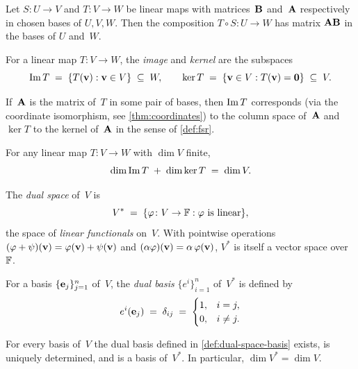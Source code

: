 \begin{theorem}
\label{thm:composition-of-maps}
Let $S \colon U \to V$ and $T \colon V \to W$ be linear maps with
matrices~$\mathbf{B}$ and~$\mathbf{A}$ respectively in chosen bases of
$U, V, W$. Then the composition $T \circ S \colon U \to W$ has matrix
$\mathbf{A}\mathbf{B}$ in the bases of $U$ and~$W$.
\end{theorem}

\begin{definition}
\label{def:image-kernel}
For a linear map $T \colon V \to W$, the \emph{image} and
\emph{kernel} are the subspaces
\[
  \operatorname{Im} T \;=\; \{T(\mathbf{v}) : \mathbf{v} \in V\} \;\subseteq\; W,
  \qquad
  \ker T \;=\; \{\mathbf{v} \in V : T(\mathbf{v}) = \mathbf{0}\} \;\subseteq\; V.
\]
\end{definition}

If~$\mathbf{A}$ is the matrix of~$T$ in some pair of bases, then
$\operatorname{Im} T$ corresponds (via the coordinate isomorphism, see
\cref{thm:coordinates}) to the column space of~$\mathbf{A}$ and
$\ker T$ to the kernel of~$\mathbf{A}$ in the sense of
\cref{def:fsr}.

\begin{theorem}
\label{thm:rank-nullity-map}
For any linear map $T \colon V \to W$ with $\dim V$ finite,
\[
  \dim \operatorname{Im} T \;+\; \dim \ker T \;=\; \dim V.
\]
\end{theorem}

\begin{definition}
\label{def:dual-space-basis}
The \emph{dual space} of~$V$ is
\[
  V^{*} \;=\; \{\varphi \colon V \to \mathbb{F} : \varphi \text{ is linear}\},
\]
the space of \emph{linear functionals} on~$V$. With pointwise
operations $(\varphi + \psi)(\mathbf{v}) = \varphi(\mathbf{v}) + \psi(\mathbf{v})$
and $(\alpha\varphi)(\mathbf{v}) = \alpha\,\varphi(\mathbf{v})$, $V^{*}$ is
itself a vector space over~$\mathbb{F}$.

For a basis $\{\mathbf{e}_j\}_{j=1}^{n}$ of~$V$, the \emph{dual basis}
$\{e^i\}_{i=1}^{n}$ of~$V^{*}$ is defined by
\[
  e^{i}(\mathbf{e}_j) \;=\; \delta_{ij}
  \;=\;
  \begin{cases}
    1, & i = j, \\
    0, & i \neq j.
  \end{cases}
\]
\end{definition}

\begin{theorem}
\label{thm:dual-basis-exists}
For every basis of~$V$ the dual basis defined in
\cref{def:dual-space-basis} exists, is uniquely determined, and is a
basis of~$V^{*}$. In particular, $\dim V^{*} = \dim V$.
\end{theorem}

